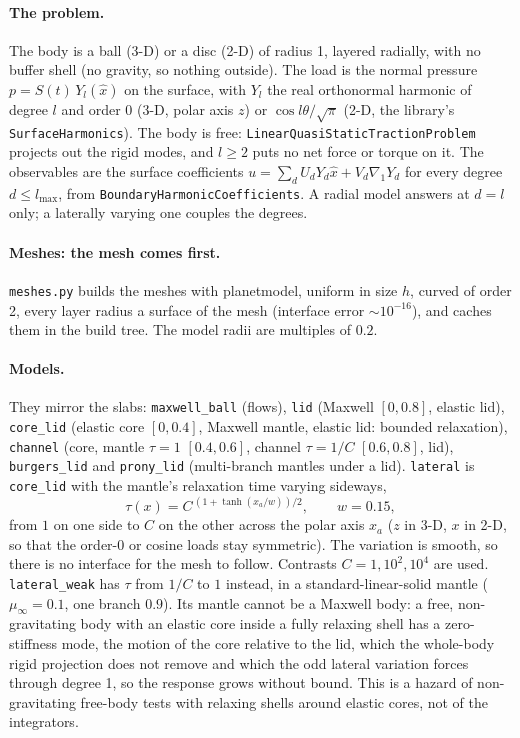 \documentclass[11pt]{article}
\numberwithin{equation}{section}
\newcommand{\code}[1]{\texttt{#1}}
\begin{document}
\paragraph{The problem.}
The body is a ball (3-D) or a disc (2-D) of radius 1, layered radially,
with no buffer shell (no gravity, so nothing outside). The load is the
normal pressure $p=S(t)\,Y_l(\hat x)$ on the surface, with $Y_l$ the real
orthonormal harmonic of degree $l$ and order 0 (3-D, polar axis $z$) or
$\cos l\theta/\sqrt\pi$ (2-D, the library's \code{SurfaceHarmonics}). The
body is free: \code{LinearQuasiStaticTractionProblem} projects out the
rigid modes, and $l\ge2$ puts no net force or torque on it. The
observables are the surface coefficients
$u=\sum_d U_dY_d\hat x+V_d\nabla_1Y_d$ for every degree $d\le l_{\max}$,
from \code{BoundaryHarmonicCoefficients}. A radial model answers at
$d=l$ only; a laterally varying one couples the degrees.

\paragraph{Meshes: the mesh comes first.}
\code{meshes.py} builds the meshes with planetmodel, uniform in size $h$,
curved of order 2, every layer radius a surface of the mesh (interface
error $\sim10^{-16}$), and caches them in the build tree. The model radii
are multiples of $0.2$.

\paragraph{Models.}
They mirror the slabs: \code{maxwell\_ball} (flows), \code{lid} (Maxwell
$[0,0.8]$, elastic lid), \code{core\_lid} (elastic core $[0,0.4]$,
Maxwell mantle, elastic lid: bounded relaxation), \code{channel} (core,
mantle $\tau=1$ $[0.4,0.6]$, channel $\tau=1/C$ $[0.6,0.8]$, lid),
\code{burgers\_lid} and \code{prony\_lid} (multi-branch mantles under a
lid). \code{lateral} is \code{core\_lid} with the mantle's relaxation
time varying sideways,
\begin{equation}
  \tau(x) = C^{\,(1+\tanh(x_a/w))/2},\qquad w=0.15,
\end{equation}
from $1$ on one side to $C$ on the other across the polar axis $x_a$
($z$ in 3-D, $x$ in 2-D, so that the order-0 or cosine loads stay
symmetric). The variation is smooth, so there is no interface for the
mesh to follow. Contrasts $C=1,10^2,10^4$ are used. \code{lateral\_weak}
has $\tau$ from $1/C$ to $1$ instead, in a standard-linear-solid mantle
($\mu_\infty=0.1$, one branch $0.9$). Its mantle cannot be a Maxwell body:
a free, non-gravitating body with an elastic core inside a fully relaxing
shell has a zero-stiffness mode, the motion of the core relative to the
lid, which the whole-body rigid projection does not remove and which the
odd lateral variation forces through degree 1, so the response grows
without bound. This is a hazard of non-gravitating free-body tests with
relaxing shells around elastic cores, not of the integrators.
\end{document}
